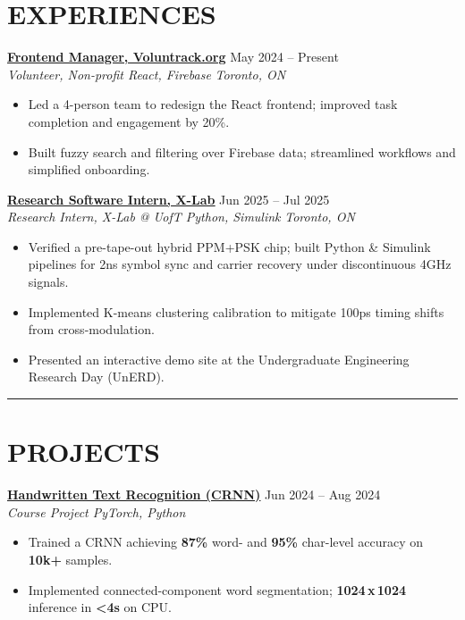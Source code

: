 \documentclass[letterpaper,10pt]{article}
\begin{document}
\section*{\textbf{EXPERIENCES}}
\noindent\href{https://volun-track.web.app}{\uline{\textbf{Frontend Manager, Voluntrack.org}}} \hfill May 2024 -- Present\\
\textit{Volunteer, Non-profit \textbar{} React, Firebase} \hfill \textit{Toronto, ON}
\begin{itemize}
    \item Led a 4-person team to redesign the React frontend; improved task completion and engagement by 20\%.
    \item Built fuzzy search and filtering over Firebase data; streamlined workflows and simplified onboarding.
\end{itemize}

\vspace{0.2cm}
\noindent\href{https://ken-2511.github.io/ppm-psk-visualize/}{\uline{\textbf{Research Software Intern, X-Lab}}} \hfill Jun 2025 -- Jul 2025\\
\textit{Research Intern, X-Lab @ UofT \textbar{} Python, Simulink} \hfill \textit{Toronto, ON}
\begin{itemize}
	\item Verified a pre-tape-out hybrid PPM+PSK chip; built Python \& Simulink pipelines for 2ns symbol sync and carrier 
    recovery under discontinuous 4GHz signals.
	\item Implemented K-means clustering calibration to mitigate 100ps timing shifts from cross-modulation.
	\item Presented an interactive demo site at the Undergraduate Engineering Research Day (UnERD).
\end{itemize}

\noindent\rule{\linewidth}{1pt}

\section*{\textbf{PROJECTS}}
\noindent\href{https://github.com/Ken-2511/HandwritingRecognition}{\uline{\textbf{Handwritten Text Recognition (CRNN)}}} \hfill Jun 2024 -- Aug 2024\\
\textit{Course Project \textbar{} PyTorch, Python}
\begin{itemize}
    \item Trained a CRNN achieving \textbf{87\%} word- and \textbf{95\%} char-level accuracy on \textbf{10k+} samples.
    \item Implemented connected-component word segmentation; \textbf{1024\,x\,1024} inference in \textbf{\textless 4s} on CPU.
\end{itemize}
\end{document}
